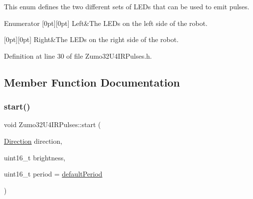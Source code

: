 This enum defines the two different sets of L\+E\+Ds that can be used to emit pulses. \begin{DoxyEnumFields}{Enumerator}
[0pt][0pt]{}\mbox{\label{class_zumo32_u4_i_r_pulses_a5252acaa381240e6b8ca499eaf304616a2283d2a79677f38342a09416734ad9e7}} 
Left&The L\+E\+Ds on the left side of the robot. \\
\hline

[0pt][0pt]{}\mbox{\label{class_zumo32_u4_i_r_pulses_a5252acaa381240e6b8ca499eaf304616abc5bb22fe2cce8d4c31f297de25d5852}} 
Right&The L\+E\+Ds on the right side of the robot. \\
\hline

\end{DoxyEnumFields}


Definition at line 30 of file Zumo32\+U4\+I\+R\+Pulses.\+h.



\subsection{Member Function Documentation}
\mbox{\label{class_zumo32_u4_i_r_pulses_abef1e5f17a173505c6acc0f8c0d917d9}} 
\subsubsection{\texorpdfstring{start()}{start()}}
{\footnotesize\ttfamily void Zumo32\+U4\+I\+R\+Pulses\+::start (\begin{DoxyParamCaption}\item[{\hyperlink{class_zumo32_u4_i_r_pulses_a5252acaa381240e6b8ca499eaf304616}{Direction}}]{direction,  }\item[{uint16\+\_\+t}]{brightness,  }\item[{uint16\+\_\+t}]{period = {\ttfamily \hyperlink{class_zumo32_u4_i_r_pulses_ae72ab04d5b682b3170a1542344cb3f75}{default\+Period}} }\end{DoxyParamCaption})\hspace{0.3cm}{\ttfamily [static]}}




